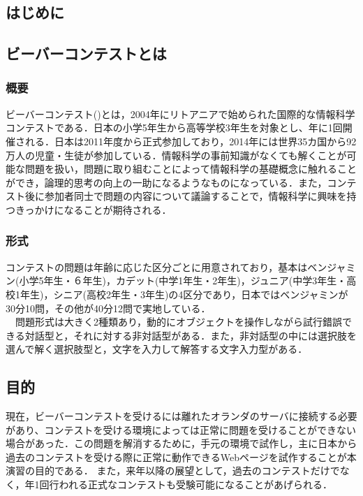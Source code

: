\documentclass[a4paper]{jarticle}
\begin{document}
\maketitle
\begin{multicols}{2}
\setcounter{page}{1}

\section{はじめに}

\subsection{ビーバーコンテストとは}
\subsubsection{概要}
ビーバーコンテスト(\cite{bebras-contest, bebras-pdf})とは，2004年にリトアニアで始められた国際的な情報科学コンテストである．日本の小学5年生から高等学校3年生を対象とし、年に1回開催される．日本は2011年度から正式参加しており，2014年には世界35カ国から92万人の児童・生徒が参加している．情報科学の事前知識がなくても解くことが可能な問題を扱い，問題に取り組むことによって情報科学の基礎概念に触れることができ，論理的思考の向上の一助になるようなものになっている．また，コンテスト後に参加者同士で問題の内容について議論することで，情報科学に興味を持つきっかけになることが期待される．

\subsubsection{形式}
 コンテストの問題は年齢に応じた区分ごとに用意されており，基本はベンジャミン(小学5年生・６年生)，カデット(中学1年生・2年生)，ジュニア(中学3年生・高校1年生)，シニア(高校2年生・3年生)の4区分であり，日本ではベンジャミンが30分10問，その他が40分12問で実地している．
\\　問題形式は大きく2種類あり，動的にオブジェクトを操作しながら試行錯誤できる対話型と，それに対する非対話型がある．また，非対話型の中には選択肢を選んで解く選択肢型と，文字を入力して解答する文字入力型がある．

\subsection{目的}
現在，ビーバーコンテストを受けるには離れたオランダのサーバに接続する必要があり、コンテストを受ける環境によっては正常に問題を受けることができない場合があった．この問題を解消するために，手元の環境で試作し，主に日本から過去のコンテストを受ける際に正常に動作できるWebページを試作することが本演習の目的である．
また，来年以降の展望として，過去のコンテストだけでなく，年1回行われる正式なコンテストも受験可能になることがあげられる．


\end{multicols}
\end{document}

